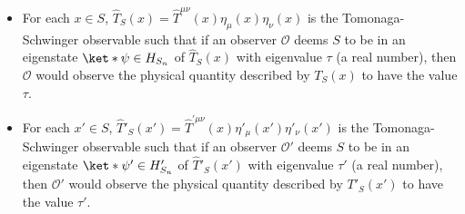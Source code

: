\documentclass[12pt]{report}
\providecommand{\DIFaddbegin}{} %
\providecommand{\DIFaddend}{} %
\providecommand{\DIFdelbegin}{} %
\providecommand{\DIFdelend}{} %
\begin{document}
\begin{itemize}
\item For each $x\in S$, $\hat{T}_S(x)=\hat{T}^{\mu\nu}(x)\eta_{\mu}(x)\eta_{\nu}(x)$ is the Tomonaga-Schwinger observable  such that if an observer $\mathcal{O}$ deems $S$ to be in an eigenstate $\ket*{\psi}\in H_{S_n}$ of  $\hat{T}_S(x)$ with eigenvalue $\tau$ (a real number), then  $\mathcal{O}$ would observe the physical quantity described by  $T_S(x)$ to have the value $\tau$. 
\item For each $x'\in S$, $\hat{T}'_S(x')=\hat{T}^{\prime\mu\nu}(x)\eta'_{\mu}(x')\eta'_{\nu}(x')$ is the Tomonaga-Schwinger observable  such that if an observer $\mathcal{O}'$ deems $S$ to be in an eigenstate $\ket*{\psi'}\in H'_{S_n}$ of  $\hat{T}'_S(x')$ with eigenvalue $\tau'$ (a real number), then  $\mathcal{O}'$ would observe the physical quantity described by  $T'_S(x')$ to have the value $\tau'$.  %
\DIFdelbegin %
\DIFdelend \DIFaddbegin {}\DIFaddend %
\end{itemize}
\end{document}
